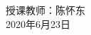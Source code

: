 {\begin{titlepage}
\vspace{3.5cm}
\begin{center}
\begin{minipage}[h]{\textwidth}
    \vfill
    \begin{center}
        {\large 授课教师：陈怀东  \\ 2020年6月23日}
    \end{center}    
\end{minipage}%
\end{center}

\end{titlepage}
}
